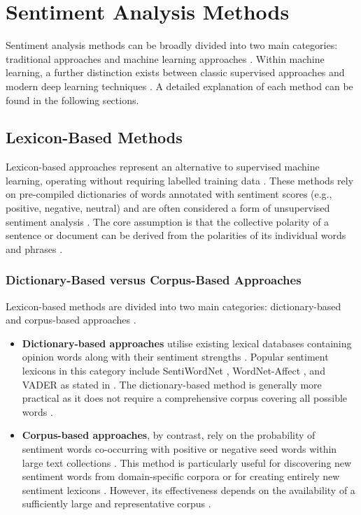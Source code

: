 \documentclass[a4paper,twoside,12pt]{book}
\begin{document}
\section{Sentiment Analysis Methods}

Sentiment analysis methods can be broadly divided into two main categories: traditional approaches and machine learning approaches \cite{sharma2025review}. Within machine learning, a further distinction exists between classic supervised approaches and modern deep learning techniques \cite{behdenna2018document}. A detailed explanation of each method can be found in the following sections.

\subsection{Lexicon-Based Methods}

Lexicon-based approaches represent an alternative to supervised machine learning, operating without requiring labelled training data \cite{azzeddine2018sentiment}. These methods rely on pre-compiled dictionaries of words annotated with sentiment scores (e.g., positive, negative, neutral) and are often considered a form of unsupervised sentiment analysis \cite{azzeddine2018sentiment}. The core assumption is that the collective polarity of a sentence or document can be derived from the polarities of its individual words and phrases \cite{azzeddine2018sentiment}.

\subsubsection{Dictionary-Based versus Corpus-Based Approaches}

Lexicon-based methods are divided into two main categories: dictionary-based and corpus-based approaches \cite{azzeddine2018sentiment, nursal2025battle, ravi2015survey}. 

\begin{itemize}	
\item \textbf{Dictionary-based approaches} utilise existing lexical databases containing opinion words along with their sentiment strengths \cite{azzeddine2018sentiment}. Popular sentiment lexicons in this category include SentiWordNet \cite{sentiwordnet2010}, WordNet-Affect \cite{strapparava2004wordnet}, and VADER \cite{hutto2015vader} as stated in \cite{nursal2025battle}. The dictionary-based method is generally more practical as it does not require a comprehensive corpus covering all possible words \cite{nursal2025battle}.

\item \textbf{Corpus-based approaches}, by contrast, rely on the probability of sentiment words co-occurring with positive or negative seed words within large text collections \cite{azzeddine2018sentiment}. This method is particularly useful for discovering new sentiment words from domain-specific corpora or for creating entirely new sentiment lexicons \cite{nursal2025battle}. However, its effectiveness depends on the availability of a sufficiently large and representative corpus \cite{nursal2025battle}.
\end{itemize}
\end{document}
